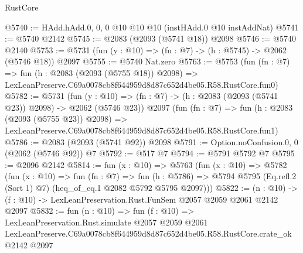 \begin{lexlean}{RustCore}
\begin{coremodule}
@5740 := HAdd.hAdd.{0, 0, 0} @10 @10 @10 (instHAdd.{0} @10 instAddNat)
@5741 := @5740 @2142
@5745 := @2083 (@2093 (@5741 @18)) @2098
@5746 := @5740 @2140
@5753 := @5731 (fun (y : @10) => (fn : @7) -> (h : @5745) -> @2062 (@5746 @18)) @2097
@5755 := @5740 Nat.zero
@5763 := @5753
    (fun (fn : @7) =>
    fun (h : @2083 (@2093 (@5755 @18)) @2098) =>
    LexLeanPreserve.C69a0078cb8f644959d8d87c652d4be05.R58.RustCore.fun0)
@5782 := @5731
    (fun (y : @10) => (fn : @7) -> (h : @2083 (@2093 (@5741 @23)) @2098) -> @2062 (@5746 @23))
    @2097
    (fun (fn : @7) =>
    fun (h : @2083 (@2093 (@5755 @23)) @2098) =>
    LexLeanPreserve.C69a0078cb8f644959d8d87c652d4be05.R58.RustCore.fun1)
@5786 := @2083 (@2093 (@5741 @92)) @2098
@5791 := Option.noConfusion.{0, 0} (@2062 (@5746 @92)) @7
@5792 := @517 @7
@5794 := @5791 @5792 @7
@5795 := @2096 @2142
@5814 := fun (x : @10) =>
  @5763
    (fun (x : @10) =>
    @5782
      (fun (x : @10) =>
      fun (fn : @7) =>
      fun (h : @5786) =>
      @5794 @5795 (Eq.refl.{2} (Sort 1) @7) (heq_of_eq.{1} @2082 @5792 @5795 @2097)))
@5822 := (n : @10) -> (f : @10) -> LexLeanPreservation.Rust.FunSem @2057 @2059 @2061 @2142 @2097
@5832 := fun (n : @10) =>
  fun (f : @10) =>
  LexLeanPreservation.Rust.simulate
    @2057
    @2059
    @2061
    LexLeanPreserve.C69a0078cb8f644959d8d87c652d4be05.R58.RustCore.crate_ok
    @2142
    @2097
\end{coremodule}
\end{lexlean}
